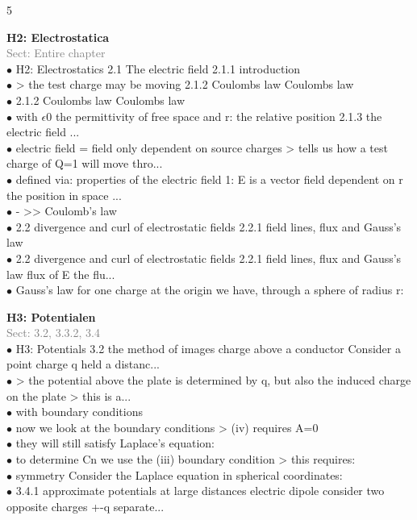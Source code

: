 \documentclass[7pt,a4paper]{article}
\begin{document}
\begin{multicols*}{5}


\textbf{H2: Electrostatica}\\\textcolor{gray}{{Sect: Entire chapter}}\\\vspace{0.5pt}
$\bullet$ H2: Electrostatics 
2.1 The electric field 
2.1.1 introduction\\
$\bullet$ > the test charge may be moving 
2.1.2 Coulombs law 
Coulombs law\\
$\bullet$ 2.1.2 Coulombs law 
Coulombs law\\
$\bullet$ with $\epsilon$0 the permittivity of free space and r:    the relative position 
2.1.3 the electric field 
...\\
$\bullet$ electric field = field only dependent on source charges 
> tells us how a test charge of Q=1 will move thro...\\
$\bullet$ defined via: 
properties of the electric field 1: E is a vector field dependent on r the position in space ...\\
$\bullet$ -     >> Coulomb's law\\
$\bullet$ 2.2 divergence and curl of electrostatic fields 
2.2.1 field lines, flux and Gauss's law\\
$\bullet$ 2.2 divergence and curl of electrostatic fields 
2.2.1 field lines, flux and Gauss's law 
flux of E the flu...\\
$\bullet$ Gauss's law for one charge at the origin we have, through a sphere of radius r:\\
\columnbreak

\textbf{H3: Potentialen}\\\textcolor{gray}{{Sect: 3.2, 3.3.2, 3.4}}\\\vspace{0.5pt}
$\bullet$ H3: Potentials 
3.2 the method of images 
charge above a conductor Consider a point charge q held a distanc...\\
$\bullet$ > the potential above the plate is determined by q, but also the induced charge on the plate  
 > this is a...\\
$\bullet$ with boundary conditions\\
$\bullet$ now we look at the boundary conditions 
> (iv) requires A=0\\
$\bullet$ they will still satisfy Laplace's equation:\\
$\bullet$ to determine Cn we use the (iii) boundary condition 
> this requires:\\
$\bullet$ symmetry  
Consider the Laplace equation in spherical coordinates:\\
$\bullet$ 3.4.1 approximate potentials at large distances 
electric dipole consider two opposite charges +-q separate...\\
\columnbreak


\end{multicols*}
\end{document}
